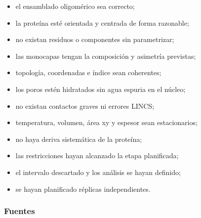 \documentclass[
  spanish,
  11pt,
  a4paper]{article}
\providecommand{\tightlist}{%
  \setlength{\itemsep}{0pt}\setlength{\parskip}{0pt}}
\begin{document}
\begin{itemize}
\tightlist
\item
  el ensamblado oligomérico sea correcto;
\item
  la proteína esté orientada y centrada de forma razonable;
\item
  no existan residuos o componentes sin parametrizar;
\item
  las monocapas tengan la composición y asimetría previstas;
\item
  topología, coordenadas e índice sean coherentes;
\item
  los poros estén hidratados sin agua espuria en el núcleo;
\item
  no existan contactos graves ni errores LINCS;
\item
  temperatura, volumen, área xy y espesor sean estacionarios;
\item
  no haya deriva sistemática de la proteína;
\item
  las restricciones hayan alcanzado la etapa planificada;
\item
  el intervalo descartado y los análisis se hayan definido;
\item
  se hayan planificado réplicas independientes.
\end{itemize}

\subsubsection{Fuentes}\label{fuentes-4}
\end{document}
